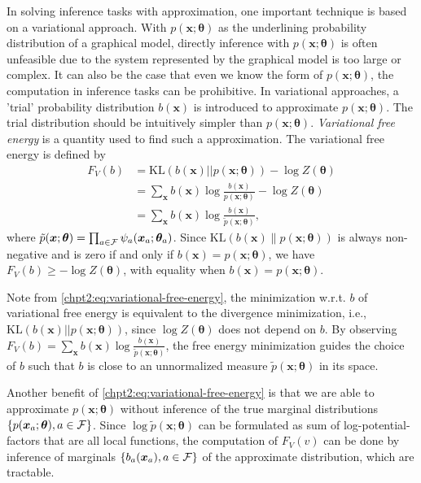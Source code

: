 In solving inference tasks with approximation, one important technique is based on a variational approach. With $p(\bm{x};\bm{\theta})$ as the underlining probability distribution of a graphical model, directly inference with $p(\bm{x}; \bm{\theta})$ is often unfeasible due to the system represented by the graphical model is too large or complex. It can also be the case that even we know the form of $p(\bm{x}; \bm{\theta})$, the computation in inference tasks can be prohibitive. In variational approaches, a 'trial' probability distribution $b(\bm{x})$ is introduced to approximate $p(\bm{x};\bm{\theta})$. The trial distribution should be intuitively simpler than $p(\bm{x}; \bm{\theta})$. \textit{Variational free energy} \cite{opper2001advanced} is a quantity used to find such a approximation. The variational free energy is defined by
\begin{align}\label{chpt2:eq:variational-free-energy}
  F_V(b) & = \mathrm{KL}(b( \bm{x}) || p(\bm{x}; \bm{\theta})) - \log{Z(\bm{\theta})} \nonumber \\
         &= \sum_{\bm{x}}b(\bm{x}) \log{\frac{b(\bm{x})}{{p}(\bm{x}; \bm{\theta})}} - \log{Z(\bm{\theta})} \nonumber \\
         & = \sum_{\bm{x}}b(\bm{x}) \log{\frac{b(\bm{x})}{\tilde{p}(\bm{x}; \bm{\theta})}},
\end{align}
where $\tilde{p}(\bm{x}; \bm{\theta}) =  \prod_{a \in \mathcal{F}} \psi_{a}(\bm{x}_{a}; \bm{\theta}_{a})$. Since $\mathrm{KL}(b(\bm{x})\|p(\bm{x};\bm{\theta}))$ is always non-negative and is zero if and only if $b(\bm{x}) = p(\bm{x};\bm{\theta})$, we have $F_V(b) \geq - \log{Z(\bm{\theta})}$, with equality when $b(\bm{x}) = p(\bm{x};\bm{\theta})$.

\begin{remark}
  Note from \ref{chpt2:eq:variational-free-energy}, the minimization w.r.t. $b$ of variational free energy is equivalent to the divergence minimization, i.e., $\mathrm{KL}(b( \bm{x}) || p(\bm{x}; \bm{\theta}))$, since $\log{Z(\bm{\theta})}$ does not depend on $b$. By observing $F_V(b) = \sum_{\bm{x}}b(\bm{x}) \log{\frac{b(\bm{x})}{\tilde{p}(\bm{x}; \bm{\theta})}}$, the free energy minimization guides the choice of $b$ such that $b$ is close to an unnormalized measure $\tilde{p}(\bm{x}; \bm{\theta})$ in its space.

  Another benefit of \ref{chpt2:eq:variational-free-energy} is that we are able to approximate $p(\bm{x}; \bm{\theta})$ without inference of the true marginal distributions $\{p(\bm{x}_{a};\bm{\theta}), a \in \mathcal{F}\}$. Since $\log\tilde{p}(\bm{x}; \bm{\theta})$ can be formulated as sum of log-potential-factors that are all local functions, the computation of $F_V(v)$ can be done by inference of marginals $\left\{ b_{a}(\bm{x}_{a}), a \in \mathcal{F} \right\}$ of the approximate distribution, which are tractable.
\end{remark}

